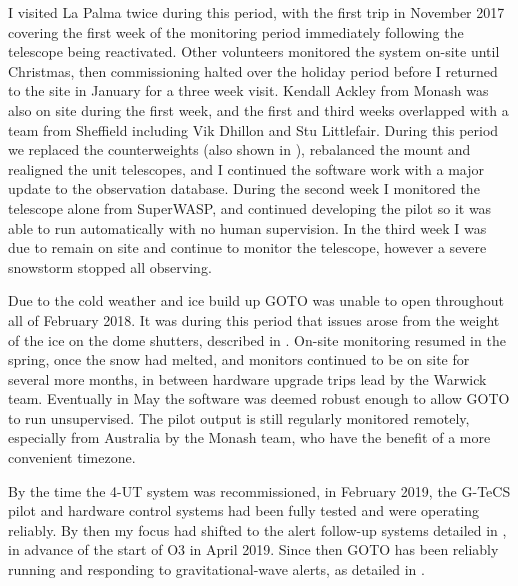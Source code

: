 \begin{colsection}
I visited La Palma twice during this period, with the first trip in November 2017 covering the first week of the monitoring period immediately following the telescope being reactivated. Other volunteers monitored the system on-site until Christmas, then commissioning halted over the holiday period before I returned to the site in January for a three week visit. Kendall Ackley from Monash was also on site during the first week, and the first and third weeks overlapped with a team from Sheffield including Vik Dhillon and Stu Littlefair. During this period we replaced the counterweights (also shown in ), rebalanced the mount and realigned the unit telescopes, and I continued the software work with a major update to the observation database. During the second week I monitored the telescope alone from SuperWASP, and continued developing the pilot so it was able to run automatically with no human supervision. In the third week I was due to remain on site and continue to monitor the telescope, however a severe snowstorm stopped all observing.

Due to the cold weather and ice build up GOTO was unable to open throughout all of February 2018. It was during this period that issues arose from the weight of the ice on the dome shutters, described in . On-site monitoring resumed in the spring, once the snow had melted, and monitors continued to be on site for several more months, in between hardware upgrade trips lead by the Warwick team. Eventually in May the software was deemed robust enough to allow GOTO to run unsupervised. The pilot output is still regularly monitored remotely, especially from Australia by the Monash team, who have the benefit of a more convenient timezone.

By the time the 4-UT system was recommissioned, in February 2019, the G-TeCS pilot and hardware control systems had been fully tested and were operating reliably. By then my focus had shifted to the alert follow-up systems detailed in , in advance of the start of O3 in April 2019. Since then GOTO has been reliably running and responding to gravitational-wave alerts, as detailed in .

\end{colsection}


